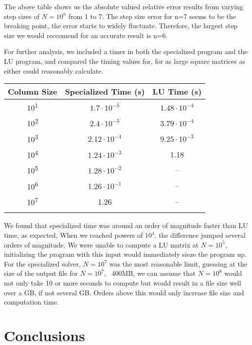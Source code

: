 \documentclass[10pt,showpacs,preprintnumbers,footinbib,amsmath,amssymb,aps,prl,twocolumn,groupedaddress,superscriptaddress,showkeys]{revtex4-1}
\begin{document}
	The above table shows us the absolute valued relative error results from varying step sizes of $N=10^{n}$ from 1 to 7. The step size error for n=7 seems to be the breaking point, the error starts to widely fluctuate. Therefore, the largest step size we would reccomend for an accurate result is n=6.  


	For further analysis, we included a timer in both the specialized program and the LU program, and compared the timing values for, for as large square matrices as either could reasonably calculate.

	\begin{center}
		\begin{tabular}{ccc}
			\hline \hline
			Column Size & Specialized Time (s) & LU Time (s)\\
			\hline		
			10\textsuperscript{1} & $1.7 \cdot 10^{-5}$      & $1.48 \cdot 10^{-4}$  \\
			10\textsuperscript{2} & $2.4 \cdot 10^{-5}$      &  $3.79 \cdot 10^{-4}$ \\
			10\textsuperscript{3} & $2.12 \cdot 10^{-4}$    &  $9.25 \cdot 10^{-3}$  \\
			10\textsuperscript{4} & $1.24 \cdot 10^{-3}$    &   1.18\\
			10\textsuperscript{5} & $1.28 \cdot 10^{-2}$    & --\\
			10\textsuperscript{6} & $1.26 \cdot 10^{-1}$    & --\\
			10\textsuperscript{7} & 1.26                               & --\\
			\hline
			\label{timingtable}
		\end{tabular}
	\end{center}
	We found that specialized time was around an order of magnitude faster than LU time, as expected, When we reached powers of $10^{4}$, the difference jumped several orders of magnitude. We were unable to compute a LU matrix at $N=10^{5}$, initializing the program with this input would immediately sieze the program up. For the specialized solver, $N=10^{7}$ was the most reasonable limit, guessing at the size of the output file for $N=10^{7}$, ~400MB, we can assume that $N=10^{8}$ would not only take 10 or more seconds to compute but would result in a file size well over a GB, if not several GB. Orders above this would only increase  file size and computation time. \\




\section{Conclusions}
\end{document}
